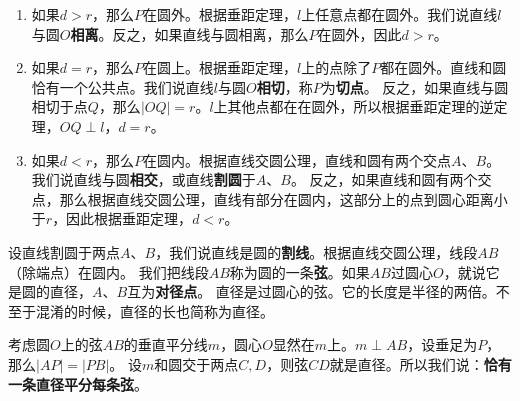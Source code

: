 \documentclass[12pt,UTF8]{ctexbook}
\begin{document}
\begin{enumerate}
    \item 如果$d > r$，那么$P$在圆外。根据垂距定理，$l$上任意点都在圆外。我们说直线$l$与圆$O$\textbf{相离}。反之，如果直线与圆相离，那么$P$在圆外，因此$d > r$。
    \item 如果$d = r$，那么$P$在圆上。根据垂距定理，$l$上的点除了$P$都在圆外。直线和圆恰有一个公共点。我们说直线$l$与圆$O$\textbf{相切}，称$P$为\textbf{切点}。
    反之，如果直线与圆相切于点$Q$，那么$|OQ| = r$。$l$上其他点都在在圆外，所以根据垂距定理的逆定理，$OQ \perp l$，$d = r$。
    \item 如果$d < r$，那么$P$在圆内。根据直线交圆公理，直线和圆有两个交点$A$、$B$。我们说直线与圆\textbf{相交}，或直线\textbf{割圆}于$A$、$B$。
    反之，如果直线和圆有两个交点，那么根据直线交圆公理，直线有部分在圆内，这部分上的点到圆心距离小于$r$，因此根据垂距定理，$d < r$。
\end{enumerate}

设直线割圆于两点$A$、$B$，我们说直线是圆的\textbf{割线}。根据直线交圆公理，线段$AB$（除端点）在圆内。
我们把线段$AB$称为圆的一条\textbf{弦}。如果$AB$过圆心$O$，就说它是圆的直径，$A$、$B$互为\textbf{对径点}。
直径是过圆心的弦。它的长度是半径的两倍。不至于混淆的时候，直径的长也简称为直径。

考虑圆$O$上的弦$AB$的垂直平分线$m$，圆心$O$显然在$m$上。$m \perp AB$，设垂足为$P$，那么$|AP| = |PB|$。
设$m$和圆交于两点$C,D$，则弦$CD$就是直径。所以我们说：\textbf{恰有一条直径平分每条弦}。



\end{document}
